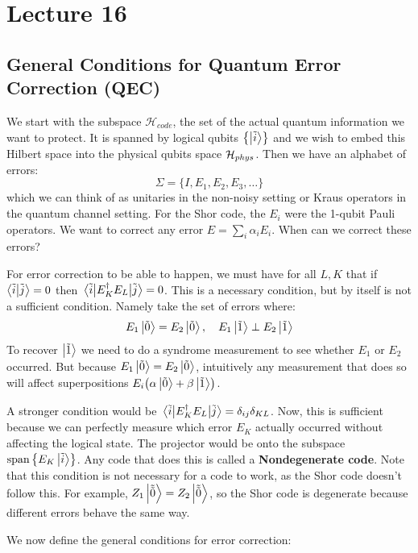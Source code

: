 \section{Lecture 16}

\subsection{General Conditions for Quantum Error Correction (QEC)}
We start with the subspace $\mathcal{H}_{code}$, the set of the actual quantum information
we want to protect. It is spanned by logical qubits $\left\{\ket{\tilde{i}}\right\}$ and we wish to embed this
Hilbert space into the physical qubits space $\operatorname{\mathcal{H}}_{phys}$. Then we have an alphabet of errors:
\[\Sigma = \{ I, E_1, E_2, E_3, \dots \}\]
 which we can think of as unitaries in the non-noisy setting or Kraus operators
in the quantum channel setting. For the Shor code, the $E_i$ were the 1-qubit Pauli operators. We
want to correct any error $E = \sum_i \alpha_i E_i$. When can we correct these errors?

For error correction to be able to happen,
we must have for all $L, K$ that if $\braket{\tilde{i}}{\tilde{j}} = 0$
then $\mel{\tilde{i}}{E_K^{\dagger} E_L}{\tilde{j}} = 0$. This is a necessary condition, but by itself is not a sufficient condition. Namely
take the set of errors where:
\[ E_1 \ket{\tilde{0}} = E_2 \ket{\tilde{0}}, \quad E_1 \ket{\tilde{1}} \perp E_2 \ket{\tilde{1}} \]
To recover $\ket{\tilde{1}}$ we need to do a syndrome measurement to see whether $E_1$ or $E_2$ occurred.
But because $E_1 \ket{\tilde{0}} = E_2 \ket{\tilde{0}}$, intuitively any measurement that does so will affect superpositions
$E_i\qty(\alpha \ket{\tilde{0}} + \beta \ket{\tilde{1}})$.

A stronger condition would be $ \mel{\tilde{i}}{E_K^{\dagger} E_L}{\tilde{j}} = \delta_{ij} \delta_{KL}$.
Now, this is sufficient because we can perfectly measure which error $E_K$ actually occurred without affecting the logical state.
The projector would be onto the subspace $\textrm{span}\left\{E_K \ket{\tilde{i}}\right\}$. Any code that does this is called a 
\textbf{Nondegenerate code}.
Note that this condition is not necessary for a code to work, as the Shor code doesn't follow this. For example, $Z_1 \ket{\tilde{\tilde{0}}} = Z_2 \ket{\tilde{\tilde{0}}}$, so the Shor code is degenerate because different errors behave the same way. 

We now define the general conditions for error correction:

